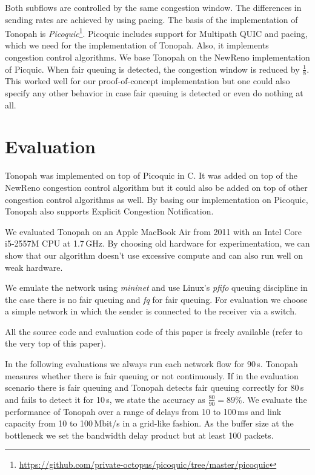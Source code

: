 \documentclass[conference]{IEEEtran}
\begin{document}
Both subflows are controlled by the same congestion window. The differences in sending rates are achieved by using pacing. 
The basis of the implementation of Tonopah is \textit{Picoquic}\footnote{\url{https://github.com/private-octopus/picoquic/tree/master/picoquic}}. 
Picoquic includes support for Multipath QUIC and pacing, which we need for the implementation of Tonopah. Also, it implements congestion control algorithms. 
We base Tonopah on the NewReno implementation of Picquic. When fair queuing is detected, the congestion window is reduced by $\frac{1}{8}$. 
This worked well for our proof-of-concept implementation but one could also specify any other behavior in case fair queuing is detected or even do nothing at all. 

\section{Evaluation}

Tonopah was implemented on top of Picoquic in C. It was added on top of the NewReno congestion control algorithm but it could also be added on top of other 
congestion control algorithms as well. By basing our implementation on Picoquic, Tonopah also supports Explicit Congestion Notification. 

We evaluated Tonopah on an Apple MacBook Air from 2011 with an Intel Core i5-2557M CPU at 1.7\,GHz. 
By choosing old hardware for experimentation, we can show that our algorithm doesn't use excessive compute and can also run well on weak hardware. 

We emulate the network using \textit{mininet} and use Linux's \textit{pfifo} queuing discipline in the case there is no fair queuing and \textit{fq} for fair queuing. 
For evaluation we choose a simple network in which the sender is connected to the receiver via a switch. 

All the source code and evaluation code of this paper is freely available (refer to the very top of this paper). 

In the following evaluations we always run each network flow for 90\,s. Tonopah measures whether there is fair queuing or not continuously. 
If in the evaluation scenario there is fair queuing and Tonopah detects fair queuing correctly for 80\,s and fails to detect it for 10\,s, we 
state the accuracy as $\frac{80}{90} = 89\%$. 
We evaluate the performance of Tonopah over a range of delays from 10 to 100\,ms and link capacity from 10 to 100\,Mbit/s in a grid-like fashion. 
As the buffer size at the bottleneck we set the bandwidth delay product but at least 100 packets. 
\end{document}
